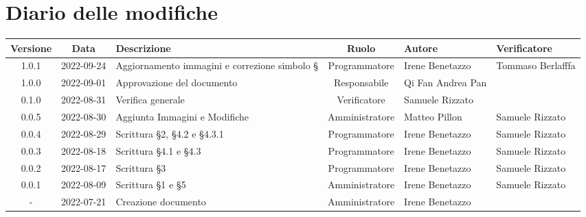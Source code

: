 \section*{Diario delle modifiche}
	\begin{center}
	\renewcommand{\arraystretch}{1.8} %
	\begin{longtable}{ |c|c|p{8em}|c|m{5em}|m{6em}| }
	\hline
	\textbf{Versione} & \textbf{Data} & \textbf{Descrizione} &  \textbf{Ruolo} &  \textbf{Autore} & \textbf{Verificatore}\\ %
	\hline %
	1.0.1 & 2022-09-24 & Aggiornamento immagini e correzione simbolo § & Programmatore & Irene \newline Benetazzo & Tommaso \newline Berlafffa \\ 
	\hline
	1.0.0& 2022-09-01 & Approvazione del documento & Responsabile & Qi Fan Andrea \newline Pan & \\ 	
	\hline
	0.1.0& 2022-08-31 & Verifica generale & Verificatore & Samuele \newline Rizzato & \\ 
	\hline
	0.0.5& 2022-08-30 & Aggiunta Immagini e Modifiche & Amministratore & Matteo \newline Pillon & Samuele \newline Rizzato\\ 
	\hline
	0.0.4& 2022-08-29 & Scrittura §2, §4.2 e §4.3.1 & Programmatore & Irene \newline Benetazzo & Samuele \newline Rizzato\\ 
	\hline
	0.0.3& 2022-08-18 & Scrittura §4.1 e §4.3 & Programmatore & Irene \newline Benetazzo & Samuele \newline Rizzato\\ 
	\hline
	0.0.2& 2022-08-17 & Scrittura §3 & Programmatore & Irene \newline Benetazzo & Samuele \newline Rizzato\\ 
	\hline
	0.0.1& 2022-08-09 & Scrittura §1 e §5 & Amministratore & Irene \newline Benetazzo & Samuele \newline Rizzato\\ 
	\hline
    -& 2022-07-21 & Creazione documento & Amministratore & Irene \newline Benetazzo & \\ 
	\hline
	\end{longtable}
	\end{center}
	\newpage